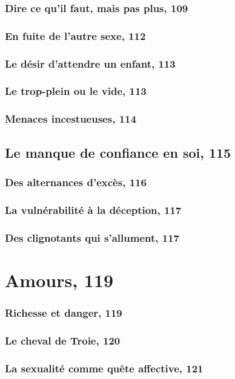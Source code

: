 \documentclass[12pt]{report}
\begin{document}
\begin{itemize}
\subsection{Dire ce qu'il faut, mais pas plus, 109}
\subsection{En fuite de l'autre sexe, 112}
\subsection{Le désir d'attendre un enfant, 113}
\subsection{Le trop-plein ou le vide, 113}
\subsection{Menaces incestueuses, 114}
\section{Le manque de confiance en soi, 115}
\subsection{Des alternances d'excès, 116}
\subsection{La vulnérabilité à la déception, 117}
\subsection{Des clignotants qui s'allument, 117}

\chapter{Amours, 119}
\subsection{Richesse et danger, 119}
\subsection{Le cheval de Troie, 120}
\subsection{La sexualité comme quête affective, 121}

\end{itemize}
\end{document}
